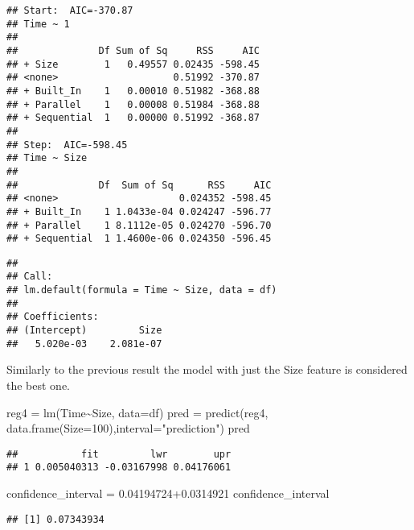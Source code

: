 \documentclass[
]{article}
\newenvironment{Shaded}{\begin{snugshade}}{\end{snugshade}}
\newcommand{\AttributeTok}[1]{\textcolor[rgb]{0.77,0.63,0.00}{#1}}
\newcommand{\DecValTok}[1]{\textcolor[rgb]{0.00,0.00,0.81}{#1}}
\newcommand{\FloatTok}[1]{\textcolor[rgb]{0.00,0.00,0.81}{#1}}
\newcommand{\FunctionTok}[1]{\textcolor[rgb]{0.00,0.00,0.00}{#1}}
\newcommand{\NormalTok}[1]{#1}
\newcommand{\OtherTok}[1]{\textcolor[rgb]{0.56,0.35,0.01}{#1}}
\newcommand{\SpecialCharTok}[1]{\textcolor[rgb]{0.00,0.00,0.00}{#1}}
\newcommand{\StringTok}[1]{\textcolor[rgb]{0.31,0.60,0.02}{#1}}
\begin{document}
\begin{verbatim}
## Start:  AIC=-370.87
## Time ~ 1
## 
##              Df Sum of Sq     RSS     AIC
## + Size        1   0.49557 0.02435 -598.45
## <none>                    0.51992 -370.87
## + Built_In    1   0.00010 0.51982 -368.88
## + Parallel    1   0.00008 0.51984 -368.88
## + Sequential  1   0.00000 0.51992 -368.87
## 
## Step:  AIC=-598.45
## Time ~ Size
## 
##              Df  Sum of Sq      RSS     AIC
## <none>                     0.024352 -598.45
## + Built_In    1 1.0433e-04 0.024247 -596.77
## + Parallel    1 8.1112e-05 0.024270 -596.70
## + Sequential  1 1.4600e-06 0.024350 -596.45
\end{verbatim}

\begin{verbatim}
## 
## Call:
## lm.default(formula = Time ~ Size, data = df)
## 
## Coefficients:
## (Intercept)         Size  
##   5.020e-03    2.081e-07
\end{verbatim}

Similarly to the previous result the model with just the Size feature is
considered the best one.

\begin{Shaded}
\begin{Highlighting}[]
\NormalTok{reg4 }\OtherTok{=} \FunctionTok{lm}\NormalTok{(Time}\SpecialCharTok{\textasciitilde{}}\NormalTok{Size, }\AttributeTok{data=}\NormalTok{df)}
\NormalTok{pred }\OtherTok{=} \FunctionTok{predict}\NormalTok{(reg4, }\FunctionTok{data.frame}\NormalTok{(}\AttributeTok{Size=}\DecValTok{100}\NormalTok{),}\AttributeTok{interval=}\StringTok{"prediction"}\NormalTok{)}
\NormalTok{pred}
\end{Highlighting}
\end{Shaded}

\begin{verbatim}
##           fit         lwr        upr
## 1 0.005040313 -0.03167998 0.04176061
\end{verbatim}

\begin{Shaded}
\begin{Highlighting}[]
\NormalTok{confidence\_interval }\OtherTok{=} \FloatTok{0.04194724+0.0314921}
\NormalTok{confidence\_interval}
\end{Highlighting}
\end{Shaded}

\begin{verbatim}
## [1] 0.07343934
\end{verbatim}
\end{document}
